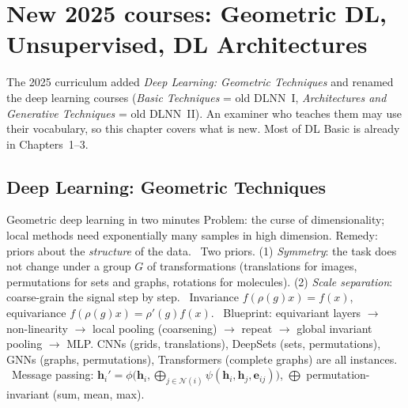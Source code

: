 \section{New 2025 courses: Geometric DL, Unsupervised, DL Architectures}

The 2025 curriculum added \emph{Deep Learning: Geometric Techniques} and renamed the deep learning
courses (\emph{Basic Techniques} = old DLNN~I, \emph{Architectures and Generative Techniques} =
old DLNN~II). An examiner who teaches them may use their vocabulary, so this chapter covers what is
new. Most of DL Basic is already in Chapters~1--3.

\subsection{Deep Learning: Geometric Techniques}

\begin{summary}{Geometric deep learning in two minutes}
\textsf{Problem:} the curse of dimensionality; local methods need exponentially many samples in
high dimension. \textsf{Remedy:} priors about the \emph{structure} of the data. \
\textsf{Two priors.} (1) \emph{Symmetry}: the task does not change under a group $G$ of
transformations (translations for images, permutations for sets and graphs, rotations for
molecules). (2) \emph{Scale separation}: coarse-grain the signal step by step. \
\textsf{Invariance} $f(\rho(g)x)=f(x)$, \textsf{equivariance} $f(\rho(g)x)=\rho'(g)f(x)$. \
\textsf{Blueprint:} equivariant layers $\to$ non-linearity $\to$ local pooling (coarsening) $\to$
repeat $\to$ global invariant pooling $\to$ MLP. CNNs (grids, translations), DeepSets (sets,
permutations), GNNs (graphs, permutations), Transformers (complete graphs) are all instances. \
\textsf{Message passing:} $\mathbf{h}_i'=\phi\bigl(\mathbf{h}_i,\bigoplus_{j\in\mathcal{N}(i)}\psi(\mathbf{h}_i,\mathbf{h}_j,\mathbf{e}_{ij})\bigr)$,
$\bigoplus$ permutation-invariant (sum, mean, max).
\end{summary}



